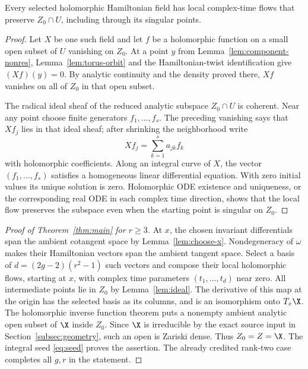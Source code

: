 \begin{lemma}\label{lem:ideal}
Every selected holomorphic Hamiltonian field has local complex-time flows
that preserve $Z_0\cap U$, including through its singular points.
\end{lemma}
\begin{proof}
Let $X$ be one such field and let $f$ be a holomorphic function on a small
open subset of $U$ vanishing on $Z_0$. At a point $y$ from
Lemma~\ref{lem:component-nonres}, Lemma~\ref{lem:torus-orbit} and the
Hamiltonian-twist identification give $(Xf)(y)=0$. By analytic continuity
and the density proved there, $Xf$ vanishes on all of $Z_0$ in that open
subset.

The radical ideal sheaf of the reduced analytic subspace $Z_0\cap U$ is
coherent. Near any point choose finite generators $f_1,\ldots,f_s$.
The preceding vanishing says that $Xf_j$ lies in that ideal sheaf; after
shrinking the neighborhood write
\[
 Xf_j=\sum_{k=1}^s a_{jk}f_k
\]
with holomorphic coefficients. Along an integral curve of $X$, the vector
$(f_1,\ldots,f_s)$ satisfies a homogeneous linear differential equation.
With zero initial values its unique solution is zero. Holomorphic ODE
existence and uniqueness, or the corresponding real ODE in each complex
time direction, shows that the local flow preserves the subspace even
when the starting point is singular on $Z_0$.
\end{proof}

\begin{proof}[Proof of Theorem~\ref{thm:main} for $r\geq3$]
At $x$, the chosen invariant differentials span the ambient cotangent
space by Lemma~\ref{lem:choose-x}. Nondegeneracy of $\omega$ makes their
Hamiltonian vectors span the ambient tangent space. Select a basis of
$d=(2g-2)(r^2-1)$ such vectors and compose their local holomorphic flows,
starting at $x$, with complex time parameters $(t_1,\ldots,t_d)$ near zero.
All intermediate points lie in $Z_0$ by Lemma~\ref{lem:ideal}. The
derivative of this map at the origin has the selected basis as its
columns, and is an isomorphism onto $T_x\X$. The holomorphic inverse
function theorem puts a nonempty ambient analytic open subset of $\X$
inside $Z_0$. Since $\X$ is irreducible by the exact source input in
Section~\ref{subsec:geometry}, such an open is Zariski dense. Thus
$Z_0=Z=\X$. The integral seed \eqref{eq:seed} proves the assertion.
The already credited rank-two case completes all $g,r$ in the statement.
\end{proof}

